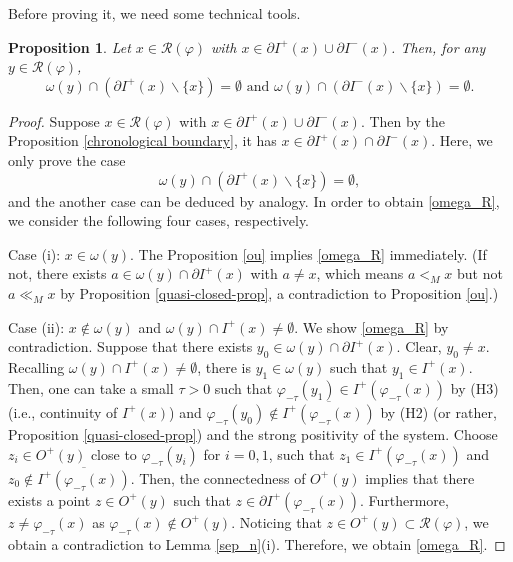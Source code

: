\documentclass[a4paper,11pt]{article}
\theoremstyle{plain}
\newtheorem{prop}[thm]{Proposition}
\theoremstyle{definition}
\numberwithin{equation}{section}
\begin{document}
Before proving it, we need some technical tools.
	\begin{prop}\label{sep_n_1}
		Let $x\in \mathcal{R}(\varphi)$ with $x\in \partial I^{+}(x)\cup\partial I^{-}(x)$. Then, for any $y\in \mathcal{R}(\varphi)$, 
		\begin{equation*}
			\omega(y)\cap(\partial I^{+}(x)\backslash\{x\})=\emptyset \text{~and~} \omega(y)\cap(\partial I^{-}(x)\backslash\{x\})=\emptyset.
		\end{equation*}
	\end{prop}

	\begin{proof}
		Suppose $x\in \mathcal{R}(\varphi)$ with $x\in \partial I^{+}(x)\cup\partial I^{-}(x)$. Then by the Proposition \ref{chronological boundary}, it has $x\in \partial I^{+}(x)\cap\partial I^{-}(x)$. Here, we only prove the case 
        \begin{equation}\label{omega_R}
			\omega(y)\cap(\partial  I^{+}(x)\backslash\{x\})=\emptyset,
		\end{equation}
        and the another case can be deduced by analogy. In order to obtain \eqref{omega_R}, we consider the following four cases, respectively.

        Case (i): $x\in\omega(y)$. The Proposition \ref{ou} implies \eqref{omega_R} immediately. (If not, there exists $a\in \omega(y)\cap\partial  I^{+}(x)$ with $a\neq x$, which means $a<_M x$ but not $a\ll_M x$ by Proposition \ref{quasi-closed-prop}, a contradiction to Proposition \ref{ou}.)

        Case (ii): $x\notin\omega(y)$ and $\omega(y)\cap  I^{+}(x)\neq\emptyset$.
		We show \eqref{omega_R} by contradiction.
		Suppose that there exists $y_{0} \in\omega(y)\cap\partial  I^{+}(x)$. Clear, $y_{0}\neq x$. Recalling $\omega(y)\cap  I^{+}(x)\neq\emptyset$, there is $y_{1} \in\omega(y)$ such that $y_{1}\in  I^{+}(x)$.
        Then, one can take a small $\tau>0$ such that $\varphi_{-\tau}(y_{1})\in  I^{+}(\varphi_{-\tau}(x))$ by (H3) (i.e., continuity of $I^{+}(x)$) and $\varphi_{-\tau}(y_{0})\notin  \overline{I^{+}(\varphi_{-\tau}(x))}$ by (H2) (or rather, Proposition \ref{quasi-closed-prop}) and the strong positivity of the system.
		Choose $z_i\in O^{+}(y)$ close to $\varphi_{-\tau}(y_i)$ for $i=0,1$,
		such that $z_1\in  I^{+}(\varphi_{-\tau}(x))$ and $z_0\notin  \overline{I^{+}(\varphi_{-\tau}(x))}$. Then, the connectedness of $O^{+}(y)$ implies that there exists a point $z\in O^{+}(y)$ such that $z\in \partial  I^{+}(\varphi_{-\tau}(x))$. Furthermore, $z\neq\varphi_{-\tau}(x)$ as $\varphi_{-\tau}(x)\notin O^{+}(y)$. Noticing that $z\in O^{+}(y)\subset \mathcal{R}(\varphi)$, we obtain a contradiction to Lemma \ref{sep_n}(i). Therefore, we obtain \eqref{omega_R}.



\end{proof}
\end{document}
